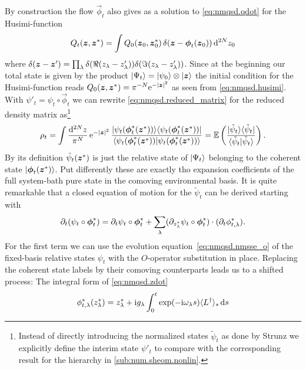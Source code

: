 By construction the flow $\vec\phi_t$ also gives as a solution to \autoref{eq:nmqsd.qdot} for the Husimi-function
\begin{equation*}
  Q_t(\boldsymbol{z}, {\boldsymbol{z}}^*) = \int Q_0(\boldsymbol{z}_0, {\boldsymbol{z}}^*_0) \, \delta(\boldsymbol{z} - \boldsymbol{\phi}_t(\boldsymbol{z}_0)) \, \mathrm{d}^{2N} z_0
\end{equation*}
where $\delta(\boldsymbol{z} - \boldsymbol{z}') = \prod_\lambda \delta(\Re(z_\lambda - z_\lambda')) \delta(\Im(z_\lambda - z_\lambda'))$.
Since at the beginning our total state is given by the product $| \Psi_t \rangle = | \psi_0 \rangle \otimes | \boldsymbol{z} \rangle$ the initial condition for the Husimi-function reads $Q_0(\zz, \cc\zz) = \pi^{-N} \exp[-\abs{\zz}^2]$ as seen from \autoref{eq:nmqsd.husimi}.
With $\psi'_t = \psi_t \circ \vec\phi_t$ we can rewrite \autoref{eq:nmqsd.reduced_matrix} for the reduced density matrix as\footnote{Instead of directly introducing the normalized states $\tilde\psi_t$ as done by Strunz \cite{St01_habil} we explicitly define the interim state $\psi'_t$ to compare with the corresponding result for the hierarchy in \autoref{sub:num.sheom.nonlin}.}
\begin{equation}
  \rho_t = \int \frac{\mathrm{d}^{2N}z}{\pi^N} \, \exp[-\abs{\zz}^2] \, \frac{\ket\psitphi \bra\psitphi}{\braket{\psitphi}{\psitphi}}
         = \E[ \frac{\ket{\tilde\psi_t}\bra{\tilde\psi_t}}{\braket{\tilde\psi_t}{\tilde\psi_t}}].
  \label{eq:nmqsd.reduced_matrix_comoving}
\end{equation}
By its definition $\tilde\psi_t({\boldsymbol{z}}^*)$ is just the relative state of $| \Psi_t \rangle$ belonging to the coherent state $| \boldsymbol{\phi}_t({\boldsymbol{z}}^*) \rangle$.
Put differently these are exactly tho expansion coefficients of the full system-bath pure state in the comoving environmental basis.
It is quite remarkable that a closed equation of motion for the $\tilde\psi_t$ can be derived starting with
\begin{equation}
  \partial_t (\psi_t \circ {\boldsymbol{\phi}}^*_t) = \partial_t\psi_t \circ {\boldsymbol{\phi}}^*_t + \sum_\lambda (\partial_{{z}^*_\lambda} \psi_t \circ {\boldsymbol{\phi}}^*_t) \cdot (\partial_t {\phi}^*_{t, \lambda}).
  \label{eq:nmqsd.psiprime_dot}
\end{equation}
For the first term we can use the evolution equation~\ref{eq:nmqsd.nmsse_o} of the fixed-basis relative states $\psi_t$ with the $O$-operator substitution in place.
Replacing the coherent state labels by their comoving counterparts leads us to a shifted process:
The integral form of \autoref{eq:nmqsd.zdot}
\begin{equation}
  \ccphitla(\cc z_\lambda) = \cc z_\lambda + \ii g_\lambda \int_0^t \exp(-\ii \omega_\lambda s) \qmean{\adj L}_s \dd s
  \label{eq:nmqsd.comoving_flow}
\end{equation}
